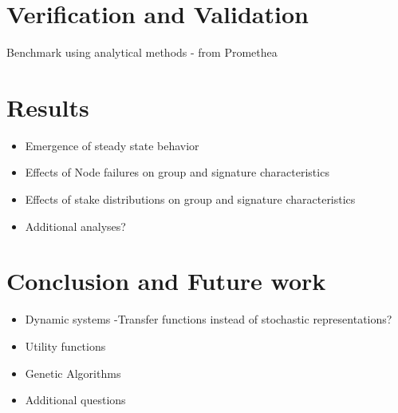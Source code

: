 \documentclass[conference]{IEEEtran}
\begin{document}
\section{Verification and Validation}
Benchmark using analytical methods - from Promethea

\section{Results}
\begin{itemize}
\item Emergence of steady state behavior
\item Effects of Node failures on group and signature characteristics
\item Effects of stake distributions on group and signature characteristics
\item Additional analyses?
\end{itemize}

\section{Conclusion and Future work}
\begin{itemize}
\item Dynamic systems -Transfer functions instead of stochastic representations?
\item Utility functions
\item Genetic Algorithms
\item Additional questions
\end{itemize}
\end{document}
